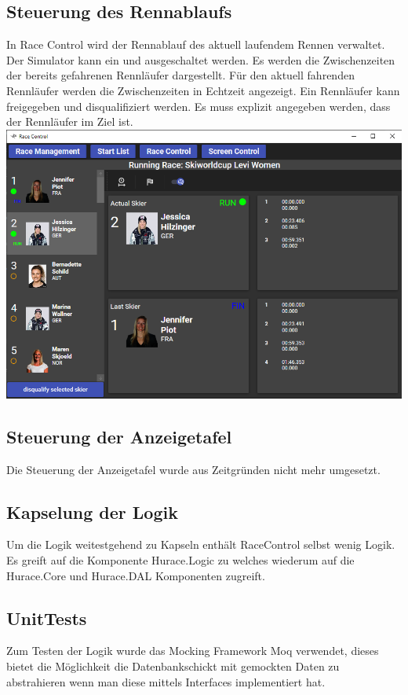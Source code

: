 \documentclass[a4paper, 12pt]{article}
\begin{document}
	\subsection{Steuerung des Rennablaufs}
	In Race Control wird der Rennablauf des aktuell laufendem Rennen verwaltet. Der Simulator kann ein und ausgeschaltet werden. Es werden die Zwischenzeiten der bereits gefahrenen Rennläufer dargestellt. Für den aktuell fahrenden Rennläufer werden die Zwischenzeiten in Echtzeit angezeigt. Ein Rennläufer kann freigegeben und disqualifiziert werden. Es muss explizit angegeben werden, dass der Rennläufer im Ziel ist.
	\newline
	\includegraphics[width=.7\textwidth]{img/ui_raceControl.png}
	\newline
	
	
	\subsection{Steuerung der Anzeigetafel}
	Die Steuerung der Anzeigetafel wurde aus Zeitgründen nicht mehr umgesetzt.
	
	\subsection{Kapselung der Logik}
	Um die Logik weitestgehend zu Kapseln enthält RaceControl selbst wenig Logik. Es greift auf die Komponente Hurace.Logic zu welches wiederum auf die Hurace.Core und Hurace.DAL Komponenten zugreift.
	
	\subsection{UnitTests}
	Zum Testen der Logik wurde das Mocking Framework Moq verwendet, dieses bietet die Möglichkeit die Datenbankschickt mit gemockten Daten zu abstrahieren wenn man diese mittels Interfaces implementiert hat.
	
\end{document}
